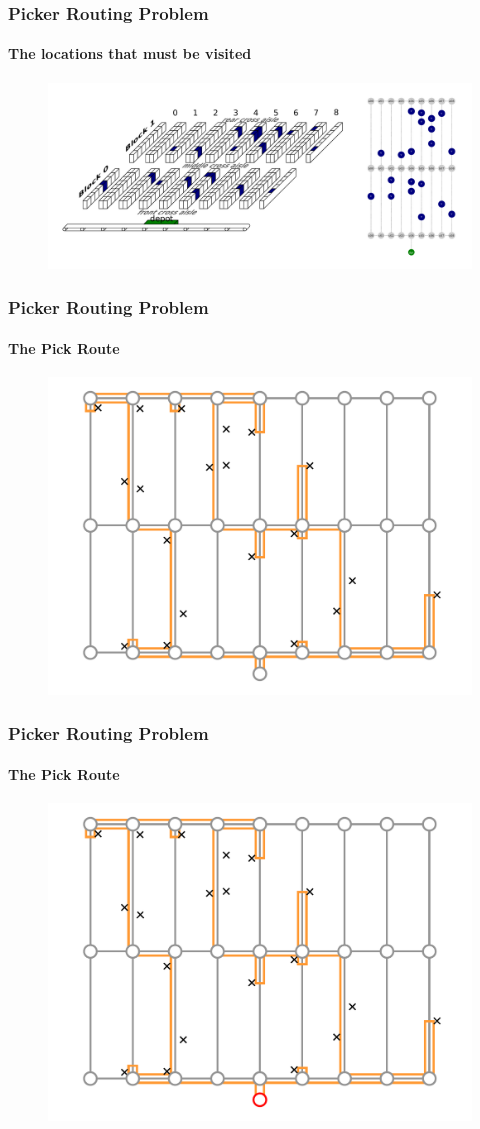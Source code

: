 \documentclass[english,a4,aspectratio=169]{beamer}
\begin{document}
\begin{frame}
\frametitle{Picker Routing Problem}
\framesubtitle{The locations that must be visited}
 \begin{figure}
  \centering
  \includegraphics[width=\textwidth]{../figures/warehouse_3d.png}
 \end{figure}
\end{frame}

\begin{frame}
\frametitle{Picker Routing Problem}
\framesubtitle{The Pick Route}
 \begin{figure}
  \centering
  \includegraphics[width=.6\textwidth]{../figures/route_optimal.pdf}
 \end{figure}
\end{frame}

\begin{frame}
\frametitle{Picker Routing Problem}
\framesubtitle{The Pick Route}
 \begin{figure}
  \centering
  \includegraphics[width=.6\textwidth]{../figures/path01.pdf}
 \end{figure}
\end{frame}
\end{document}
